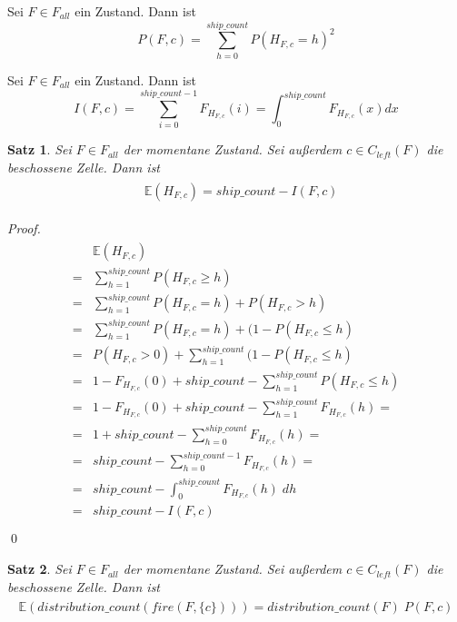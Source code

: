 \documentclass[a4paper,12pt]{llncs}
\numberwithin{equation}{section}
\newtheorem{satz}{Satz}
\begin{document}
\begin{definition}
Sei $F\in F_{all}$ ein Zustand.
Dann ist
\[
P(F,c)=\sum_{h=0}^{ship\_count} P(H_{F,c}=h)^2
\]
\end{definition}

\begin{definition}
Sei $F\in F_{all}$ ein Zustand.
Dann ist
\[
I(F,c)=\sum_{i=0}^{ship\_count - 1} F_{H_{F,c}}(i)=\int_{0}^{ship\_count} F_{H_{F,c}}(x) dx
\]
\end{definition}

\begin{satz}
Sei $F\in F_{all}$ der momentane Zustand.
Sei außerdem $c \in C_{left}(F)$ die beschossene Zelle.
Dann ist
\begin{align}
\begin{split}
&\mathds{E}(H_{F,c})=ship\_count - I(F,c)
\end{split}
\end{align}
\end{satz}

\begin{proof}
\begin{align}
\begin{split}
&\mathds{E}(H_{F,c})\\
=&\sum_{h=1}^{ship\_count} P(H_{F,c} \geq h)\\
=&\sum_{h=1}^{ship\_count} P(H_{F,c}=h) + P(H_{F,c} > h)\\
=&\sum_{h=1}^{ship\_count} P(H_{F,c}=h) + (1 - P(H_{F,c} \leq h)\\
=&P(H_{F,c} > 0) + \sum_{h=1}^{ship\_count} (1 - P(H_{F,c} \leq h)\\
=&1 - F_{H_{F,c}}(0) + ship\_count - \sum_{h=1}^{ship\_count} P(H_{F,c} \leq h)\\
=&1 - F_{H_{F,c}}(0) + ship\_count - \sum_{h=1}^{ship\_count} F_{H_{F,c}}(h)=\\
=&1 + ship\_count - \sum_{h=0}^{ship\_count} F_{H_{F,c}}(h)=\\
=&ship\_count - \sum_{h=0}^{ship\_count - 1} F_{H_{F,c}}(h)=\\
=&ship\_count - \int_{0}^{ship\_count} F_{H_{F,c}}(h) \; dh\\
=&ship\_count - I(F,c)\\
\end{split}
\end{align}
\qed
\end{proof}


\begin{satz}
Sei $F\in F_{all}$ der momentane Zustand.
Sei außerdem $c \in C_{left}(F)$ die beschossene Zelle.
Dann ist
\begin{align}
\begin{split}
\mathds{E}(distribution\_count(fire(F,\{c\})))=distribution\_count(F)\; P(F,c)
\end{split}
\end{align}
\end{satz}
\end{document}
